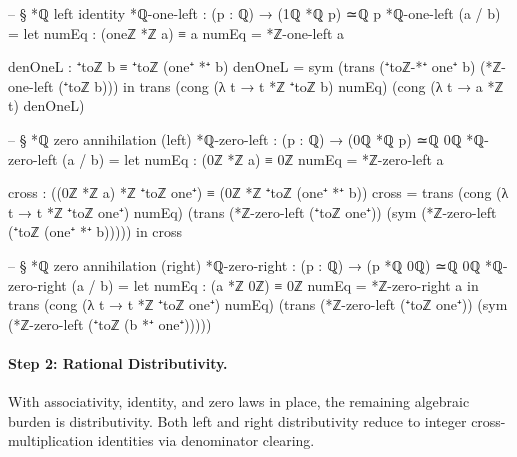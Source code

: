 \documentclass[11pt,a4paper]{book}
\begin{document}
\begin{code}
-- § *ℚ left identity
*ℚ-one-left : (p : ℚ) → (1ℚ *ℚ p) ≃ℚ p
*ℚ-one-left (a / b) =
  let
    numEq : (oneℤ *ℤ a) ≡ a
    numEq = *ℤ-one-left a

    denOneL : ⁺toℤ b ≡ ⁺toℤ (one⁺ *⁺ b)
    denOneL = sym (trans (⁺toℤ-*⁺ one⁺ b) (*ℤ-one-left (⁺toℤ b)))
  in
  trans
    (cong (λ t → t *ℤ ⁺toℤ b) numEq)
    (cong (λ t → a *ℤ t) denOneL)

-- § *ℚ zero annihilation (left)
*ℚ-zero-left : (p : ℚ) → (0ℚ *ℚ p) ≃ℚ 0ℚ
*ℚ-zero-left (a / b) =
  let
    numEq : (0ℤ *ℤ a) ≡ 0ℤ
    numEq = *ℤ-zero-left a

    cross : ((0ℤ *ℤ a) *ℤ ⁺toℤ one⁺) ≡ (0ℤ *ℤ ⁺toℤ (one⁺ *⁺ b))
    cross =
      trans
        (cong (λ t → t *ℤ ⁺toℤ one⁺) numEq)
        (trans
          (*ℤ-zero-left (⁺toℤ one⁺))
          (sym (*ℤ-zero-left (⁺toℤ (one⁺ *⁺ b)))))
  in
  cross

-- § *ℚ zero annihilation (right)
*ℚ-zero-right : (p : ℚ) → (p *ℚ 0ℚ) ≃ℚ 0ℚ
*ℚ-zero-right (a / b) =
  let
    numEq : (a *ℤ 0ℤ) ≡ 0ℤ
    numEq = *ℤ-zero-right a
  in
  trans
    (cong (λ t → t *ℤ ⁺toℤ one⁺) numEq)
    (trans
      (*ℤ-zero-left (⁺toℤ one⁺))
      (sym (*ℤ-zero-left (⁺toℤ (b *⁺ one⁺)))))
\end{code}

\paragraph{Step 2: Rational Distributivity.}
With associativity, identity, and zero laws in place, the remaining
algebraic burden is distributivity. Both left and right distributivity
reduce to integer cross-multiplication identities via denominator
clearing.
\end{document}
